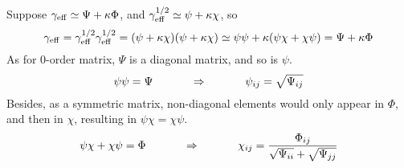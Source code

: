 \documentclass[fleqn,10pt]{InternshipReport_SI-ENS-PSL}
\begin{document}
Suppose $\gamma_{\mathrm{eff}} \simeq \Psi + \kappa \Phi$, %
and $\gamma^{1/2}_\mathrm{eff} \simeq \psi + \kappa\chi$, so
$$ \gamma_{\mathrm{eff}} = \gamma_{\mathrm{eff}}^{1/2}\gamma_{\mathrm{eff}}^{1/2} = (\psi + \kappa\chi)(\psi + \kappa\chi) \simeq \psi\psi + \kappa (\psi\chi + \chi\psi) = \Psi + \kappa \Phi $$
As for 0-order matrix, $\Psi$ is a diagonal matrix, and so is $\psi$. 
$$ \psi\psi = \Psi \ \ \ \ \ \ \ \ \ \  \Rightarrow \ \ \ \ \ \ \ \ \ \  \psi_{ij} =\sqrt{\Psi_{ij} } $$ 
Besides, as a symmetric matrix, non-diagonal elements would only appear in $\Phi$, and then in $\chi$, resulting in $\psi\chi = \chi\psi$.
$$ \psi\chi + \chi\psi = \Phi \ \ \ \ \ \ \ \ \ \  \Rightarrow \ \ \ \ \ \ \ \ \ \  \chi_{ij} = \frac{\Phi_{ij}}{\sqrt{\Psi_{ii}} + \sqrt{\Psi_{jj}}} $$

\end{document}
